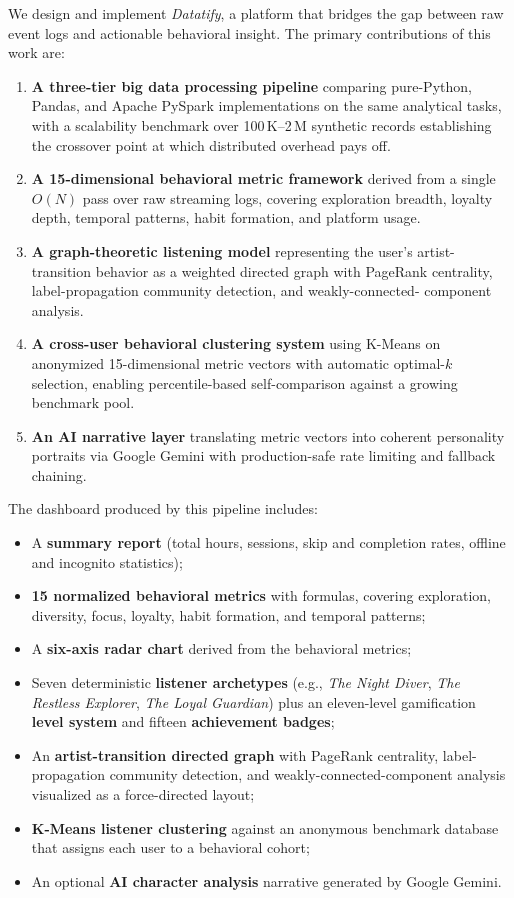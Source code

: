 \documentclass[conference]{IEEEtran}
\begin{document}
We design and implement \textit{Datatify}, a platform that bridges the gap
between raw event logs and actionable behavioral insight. The primary
contributions of this work are:
\begin{enumerate}
  \item \textbf{A three-tier big data processing pipeline} comparing
        pure-Python, Pandas, and Apache PySpark implementations on the same
        analytical tasks, with a scalability benchmark over 100\,K–2\,M
        synthetic records establishing the crossover point at which
        distributed overhead pays off.
  \item \textbf{A 15-dimensional behavioral metric framework} derived from
        a single $O(N)$ pass over raw streaming logs, covering exploration
        breadth, loyalty depth, temporal patterns, habit formation, and
        platform usage.
  \item \textbf{A graph-theoretic listening model} representing the user's
        artist-transition behavior as a weighted directed graph with PageRank
        centrality, label-propagation community detection, and weakly-connected-
        component analysis.
  \item \textbf{A cross-user behavioral clustering system} using K-Means on
        anonymized 15-dimensional metric vectors with automatic optimal-$k$
        selection, enabling percentile-based self-comparison against a growing
        benchmark pool.
  \item \textbf{An AI narrative layer} translating metric vectors into
        coherent personality portraits via Google Gemini with production-safe
        rate limiting and fallback chaining.
\end{enumerate}

The dashboard produced by this pipeline includes:
\begin{itemize}
  \item A \textbf{summary report} (total hours, sessions, skip and completion
        rates, offline and incognito statistics);
  \item \textbf{15 normalized behavioral metrics} with formulas, covering
        exploration, diversity, focus, loyalty, habit formation, and temporal
        patterns;
  \item A \textbf{six-axis radar chart} derived from the behavioral metrics;
  \item Seven deterministic \textbf{listener archetypes} (e.g., \textit{The
        Night Diver}, \textit{The Restless Explorer}, \textit{The Loyal
        Guardian}) plus an eleven-level gamification \textbf{level system} and
        fifteen \textbf{achievement badges};
  \item An \textbf{artist-transition directed graph} with PageRank centrality,
        label-propagation community detection, and weakly-connected-component
        analysis visualized as a force-directed layout;
  \item \textbf{K-Means listener clustering} against an anonymous benchmark
        database that assigns each user to a behavioral cohort;
  \item An optional \textbf{AI character analysis} narrative generated by
        Google Gemini.
\end{itemize}
\end{document}

